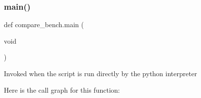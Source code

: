 \subsubsection{\texorpdfstring{main()}{main()}}
{\footnotesize\ttfamily def compare\+\_\+bench.\+main (\begin{DoxyParamCaption}\item[{void}]{ }\end{DoxyParamCaption})}

\begin{DoxyVerb}Invoked when the script is run directly by the python interpreter
\end{DoxyVerb}
 Here is the call graph for this function\+:
